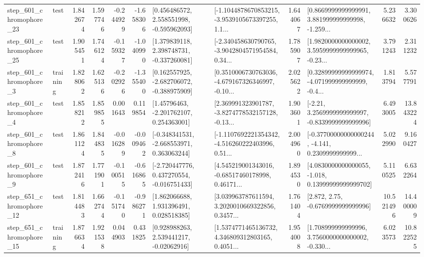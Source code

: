 \begin{tabular}{llrrrrllrlrr}
  step\_601\_chromophore\_23 &      test &      1.842674 &    1.597746 &     -0.244929 & -1.658306 &    [0.456486572, 2.558551998, -0.595962093] &  [-1.1044878670853215, -3.9539105673397255, 1.1... &       1.644067 &  [0.8669999999999991, 3.881999999999998, -1.259... &            5.236632 &          3.300626 \\
  step\_601\_chromophore\_25 &      test &      1.905451 &    1.746124 &     -0.159327 & -1.040990 &    [1.379839118, 2.398748731, -0.337260081] &  [-2.340458630790765, -3.9042804571954584, 0.34... &       1.785907 &  [1.9820000000000002, 3.5959999999999965, -0.23... &            3.791243 &          2.311232 \\
   step\_601\_chromophore\_3 &  training &      1.828062 &    1.625136 &     -0.202926 & -1.355400 &   [0.162557925, -2.682706072, -0.388975909] &  [0.3510006730763036, -4.679167326346997, -0.10... &       2.025622 &  [0.32899999999999974, -4.071999999999999, -0.4... &            1.813794 &          5.577791 \\
   step\_601\_chromophore\_4 &      test &      1.858212 &    1.859855 &      0.001643 &  0.119854 &     [1.45796463, -2.201762107, 0.254363001] &  [2.369991323901787, -3.8274778532157128, -0.13... &       1.903601 &   [-2.21, 3.2569999999999997, -0.8339999999999996] &            6.493005 &         13.843224 \\
   step\_601\_chromophore\_8 &      test &      1.861124 &    1.844835 &     -0.016289 & -0.009462 &   [-0.348341531, -2.668553971, 0.363063244] &  [-1.1107692221354342, -4.516260222403996, 0.51... &       2.004960 &  [-0.37700000000000244, -4.141, 0.2309999999999... &            5.022990 &          9.160427 \\
   step\_601\_chromophore\_9 &      test &      1.872416 &    1.771901 &     -0.100515 & -0.616865 &   [-2.720447776, 0.437270554, -0.016751433] &  [4.545219001343016, -0.68517460178998, 0.46171... &       1.894530 &  [4.0830000000000055, -1.018, 0.13999999999999702] &            5.110525 &          6.632264 \\
  step\_651\_chromophore\_12 &      test &      1.814483 &    1.662744 &     -0.151740 & -0.986271 &     [1.862066688, 1.931396491, 0.028518385] &  [3.039963787611594, 3.2020010669322856, 0.3457... &       1.761404 &                 [2.872, 2.75, -0.6769999999999996] &           10.521496 &         14.400009 \\
  step\_651\_chromophore\_15 &  training &      1.876634 &    1.921538 &      0.044903 &  0.431825 &     [0.928988263, 2.539441217, -0.02062916] &  [1.5374771465136732, 4.346809312803165, 0.4051... &       1.954008 &  [1.708999999999996, 3.7560000000000002, -0.330... &            6.023573 &         10.822525 \\

\end{tabular}
